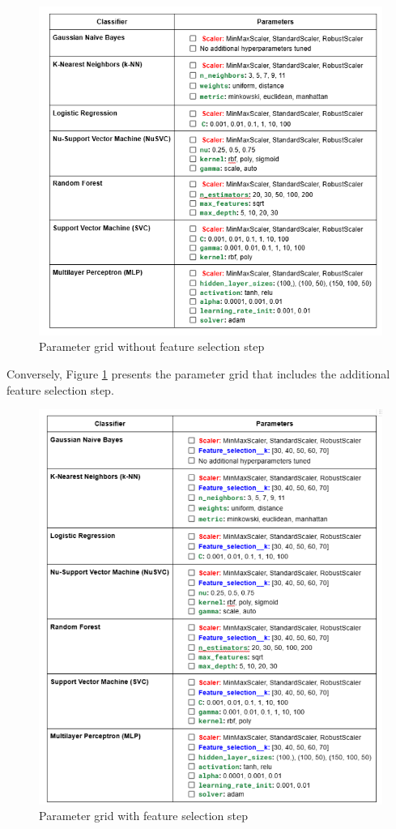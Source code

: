 \documentclass{article}
\begin{document}
\begin{figure}[ht]
    \centering
    \includegraphics[width = 0.8
    \textwidth]{Images/Results/param_grid_nofs.png}
    \caption{Parameter grid without feature selection step}
    \label{fig:pg_nofs}
\end{figure}

Conversely, Figure \ref{fig:pg_nofs} presents the parameter grid that includes the additional feature selection step.

\begin{figure}[ht]
    \centering
    \includegraphics[width = 0.8
    \textwidth]{Images/Results/fs.png}
    \caption{Parameter grid with feature selection step}
    \label{fig:pg_fs}
\end{figure}
\end{document}

